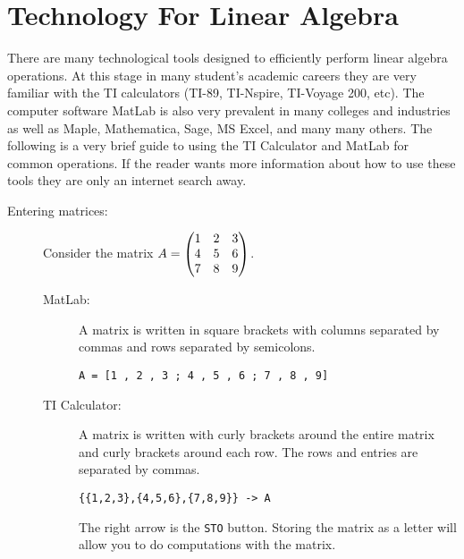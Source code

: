 \section{Technology For Linear Algebra}
There are many technological tools designed to efficiently perform linear algebra
operations.  At this stage in many student's academic careers they are very familiar with
the TI calculators (TI-89, TI-Nspire, TI-Voyage 200, etc).  The computer software MatLab
is also very prevalent in many colleges and industries as well as Maple, Mathematica,
Sage, MS Excel, and many many others.  The following is a very brief guide to using the TI
Calculator and MatLab for common operations. If the reader wants more information about
how to use these tools they are only an internet search away.

\begin{description}
    \item[Entering matrices:]  Consider the matrix $A = \begin{pmatrix} 1 & 2 & 3 \\ 4 & 5 & 6 \\ 7 &
        8 & 9 \end{pmatrix}$.
        \begin{description}
            \item[MatLab:] A matrix is written in square brackets with columns separated
                by commas and rows separated by semicolons.
\begin{verbatim}
A = [1 , 2 , 3 ; 4 , 5 , 6 ; 7 , 8 , 9]
\end{verbatim}
            \item[TI Calculator:] A matrix is written with curly brackets around the
                entire matrix and curly brackets around each row.  The rows and entries
                are separated by commas.
\begin{verbatim}
{{1,2,3},{4,5,6},{7,8,9}} -> A
\end{verbatim}
                The right arrow is the \texttt{STO} button.  Storing the matrix as a
                letter will allow you to do computations with the matrix.
        \end{description}


\end{description}
